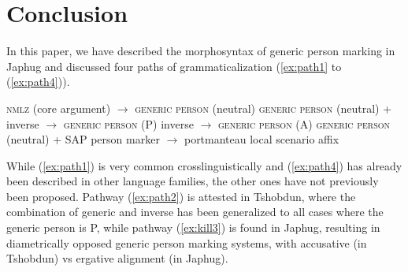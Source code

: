 \documentclass[oneside,a4paper,11pt]{article}
\newcommand{\refb}[1]{(\ref{#1})}
\begin{document}
\section{Conclusion}
In this paper, we have described the morphosyntax of generic person marking in Japhug and discussed four paths of grammaticalization (\ref{ex:path1} to \refb{ex:path4}).


\begin{exe}
\ex \label{ex:path1}
\glt  \textsc{nmlz} (core argument) $\rightarrow$ \textsc{generic person} (neutral)
\ex \label{ex:path2}
\glt  \textsc{generic person} (neutral) + inverse  $\rightarrow$ \textsc{generic person} (P)
\ex \label{ex:path3}
\glt inverse  $\rightarrow$ \textsc{generic person} (A)
\ex \label{ex:path4}
\glt  \textsc{generic person} (neutral) + SAP person marker  $\rightarrow$ portmanteau local scenario affix
\end{exe}

While \refb{ex:path1} is very common crosslinguistically and \refb{ex:path4} has already been described in other language families, the other ones have not previously been proposed. Pathway \refb{ex:path2} is attested in Tshobdun, where the combination of generic and inverse has been generalized to all cases where the generic person is P, while pathway \refb{ex:kill3} is found in Japhug, resulting in diametrically opposed generic person marking systems, with accusative (in Tshobdun) vs ergative alignment (in Japhug).



\end{document}
